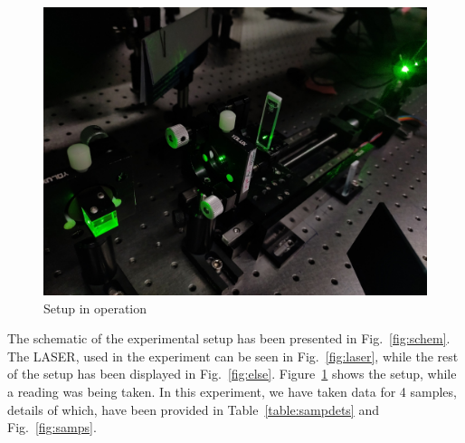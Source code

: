 \documentclass[%
 reprint,
amsmath,
amssymb,
10pt
]{revtex4-2}
\begin{document}
\begin{figure}
    \centering
    \includegraphics[width=0.9\linewidth]{images/run.jpg}
    \caption{Setup in operation}
    \label{fig:run}
\end{figure}

The schematic of the experimental setup has been presented in Fig.~\ref{fig:schem}. The LASER, used in the experiment can be seen in Fig.~\ref{fig:laser}, while the rest of the setup has been displayed in Fig.~\ref{fig:else}. Figure~\ref{fig:run} shows the setup, while a reading was being taken. In this experiment, we have taken data for 4 samples, details of which, have been provided in Table~\ref{table:sampdets} and Fig.~\ref{fig:samps}.
\end{document}
